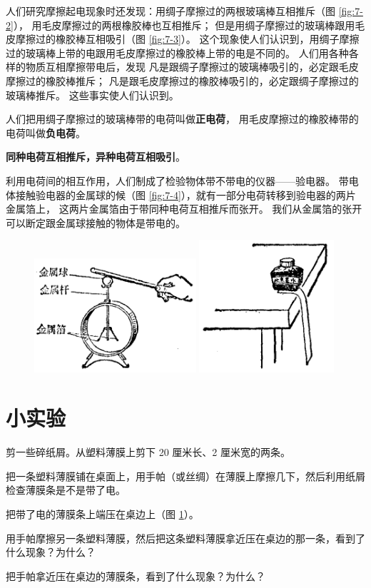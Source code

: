 人们研究摩擦起电现象时还发现：用绸子摩擦过的两根玻璃棒互相推斥（图 \ref{fig:7-2}），
用毛皮摩擦过的两根橡胶棒也互相推斥；
但是用绸子摩擦过的玻璃棒跟用毛皮摩擦过的橡胶棒互相吸引（图 \ref{fig:7-3}）。
这个现象使人们认识到，用绸子摩擦过的玻璃棒上带的电跟用毛皮摩擦过的橡胶棒上带的电是不同的。
人们用各种各样的物质互相摩擦带电后，发现
凡是跟绸子摩擦过的玻璃棒吸引的，必定跟毛皮摩擦过的橡胶棒推斥；
凡是跟毛皮摩擦过的橡胶棒吸引的，必定跟绸子摩擦过的玻璃棒推斥。
这些事实使人们认识到。

人们把用绸子摩擦过的玻璃棒带的电荷叫做\textbf{正电荷}，
     用毛皮摩擦过的橡胶棒带的电荷叫做\textbf{负电荷}。

\textbf{同种电荷互相推斥，异种电荷互相吸引}。

利用电荷间的相互作用，人们制成了检验物体带不带电的仪器——验电器。
带电体接触验电器的金属球的候（图 \ref{fig:7-4}），就有一部分电荷转移到验电器的两片金属箔上，
这两片金属箔由于带同种电荷互相推斥而张开。
我们从金属箔的张开可以断定跟金属球接触的物体是带电的。

\begin{figure}[htbp]
    \centering
    \begin{minipage}{7cm}
    \centering
    \includegraphics[width=6cm]{../pic/czwl2-ch7-4}
    \caption{}\label{fig:7-4}
    \end{minipage}
    \qquad
    \begin{minipage}{7cm}
    \centering
    \includegraphics[width=5cm]{../pic/czwl2-ch7-5}
    \caption{}\label{fig:7-5}
    \end{minipage}
\end{figure}

\section*{小实验}

剪一些碎纸屑。从塑料薄膜上剪下 20 厘米长、2 厘米宽的两条。

把一条塑料薄膜铺在桌面上，用手帕（或丝绸）在薄膜上摩擦几下，然后利用纸屑检查薄膜条是不是带了电。

把带了电的薄膜条上端压在桌边上（图 \ref{fig:7-5}）。

用手帕摩擦另一条塑料薄膜，然后把这条塑料薄膜拿近压在桌边的那一条，看到了什么现象？为什么？

把手帕拿近压在桌边的薄膜条，看到了什么现象？为什么？


